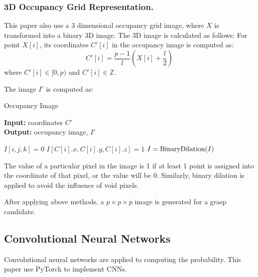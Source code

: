 \documentclass[letterpaper]{article} %
\begin{document}
\subsubsection{3D Occupancy Grid Representation.} This paper also use a 3 dimensional occupancy grid image, where $X$ is transformed into a binary 3D image. The 3D image is calculated as follows:
For point $X[i]$, its coordinates $C'[i]$ in the occupancy image is computed as:
\begin{equation}
    C'[i]=\frac{p-1}{l} (X[i]+\frac{l}{2})
\end{equation}
where $C'[i]\in [0, p)$ and $C'[i]\in \mathbb{Z}$.

The image $I'$ is computed as:
\begin{algorithm}[H]
\caption{Occupancy Image}
\textbf{Input:} coordinates $C'$\\
\textbf{Output:} occupancy image, $I'$\\
\begin{algorithmic}[1]
\STATE $I[i, j, k] = 0$
\ENDFOR
\ENDFOR
\ENDFOR
{}
\STATE $I[C[i].x, C[i].y, C[i].z]=1$
\ENDFOR
\STATE $I={\rm BinaryDilation}(I)$
\end{algorithmic}
\end{algorithm}

The value of a particular pixel in the image is 1 if at least 1 point is assigned into the coordinate of that pixel, or the value will be 0. Similarly, binary dilation \cite{BK1} is applied to avoid the influence of void pixels.

After applying above methods, a $p\times p\times p$ image is generated for a grasp candidate.

\subsection{Convolutional Neural Networks}
Convolutional neural networks are applied to computing the probability. This paper use PyTorch \cite{Pytorch} to implement CNNs.
\end{document}
